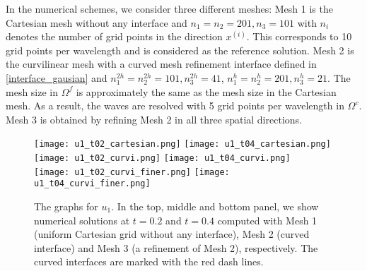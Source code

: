 In the numerical schemes, we consider three different meshes: Mesh 1 is the Cartesian mesh without any interface and $n_1 = n_2 = 201, n_3 = 101$ with $n_i$ denotes the number of grid points in the direction $x^{(i)}$. This corresponds to 10 grid points per wavelength and is considered as the  reference solution. Mesh 2 is the curvilinear mesh with a curved mesh refinement interface defined in \eqref{interface_gausian} and $n_1^{2h} = n_2^{2h} = 101, n_3^{2h} = 41$, $n_1^h = n_2^h = 201, n_3^h = 21$. The mesh size in $\Omega^f$ is approximately the same as the mesh size in the Cartesian mesh. As a result, the waves are resolved with 5 grid points per wavelength in $\Omega^c$. Mesh 3 is obtained by refining Mesh 2 in all three spatial directions. %

\begin{figure}[htbp]
	\centering
	\texttt{[image: u1\_t02\_cartesian.png]}
	\texttt{[image: u1\_t04\_cartesian.png]}\\
	\texttt{[image: u1\_t02\_curvi.png]}
	\texttt{[image: u1\_t04\_curvi.png]}\\
	\texttt{[image: u1\_t02\_curvi\_finer.png]}
	\texttt{[image: u1\_t04\_curvi\_finer.png]}
\caption{The graphs for $u_1$. In the top, middle and bottom panel, we show numerical solutions at $t=0.2$ and $t=0.4$ computed with Mesh 1 (uniform Cartesian grid without any interface), Mesh 2 (curved interface) and Mesh 3 (a refinement of Mesh 2), respectively. The curved interfaces are marked with the red dash lines.}
\label{u1}
\end{figure}


